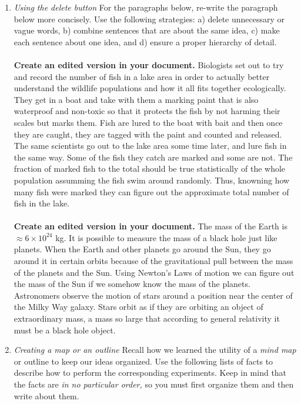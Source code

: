 \documentclass{article}
\begin{document}
\begin{enumerate}
\item \textit{Using the delete button} For the paragraphs below, re-write the paragraph below more concisely.  Use the following strategies: a) delete unnecessary or vague words, b) combine sentences that are about the same idea, c) make each sentence about one idea, and d) ensure a proper hierarchy of detail. \\ \\
\textbf{Create an edited version in your document.}  Biologists set out to try and record the number of fish in a lake area in order to actually better understand the wildlife populations and how it all fits together ecologically.  They get in a boat and take with them a marking paint that is also waterproof and non-toxic so that it protects the fish by not harming their scales but marks them.  Fish are lured to the boat with bait and then once they are caught, they are tagged with the paint and counted and released.  The same scientists go out to the lake area some time later, and lure fish in the same way.  Some of the fish they catch are marked and some are not.  The fraction of marked fish to the total should be true statistically of the whole population assumming the fish swim around randomly.  Thus, knowning how many fish were marked they can figure out the approximate total number of fish in the lake. \\ \\
\textbf{Create an edited version in your document.}  The mass of the Earth is $\approx 6 \times 10^{24}$ kg. It is possible to measure the mass of a black hole just like planets.  When the Earth and other planets go around the Sun, they go around it in certain orbits because of the gravitational pull between the mass of the planets and the Sun.  Using Newton's Laws of motion we can figure out the mass of the Sun if we somehow know the mass of the planets.  Astronomers observe the motion of stars around a position near the center of the Milky Way galaxy.  Stars orbit as if they are orbiting an object of extraordinary mass, a mass so large that according to general relativity it must be a black hole object.
\item \textit{Creating a map or an outline} Recall how we learned the utility of a \textit{mind map} or outline to keep our ideas organized.  Use the following lists of facts to describe how to perform the corresponding experiments.  Keep in mind that the facts are \textit{in no particular order,} so you must first organize them and then write about them. \\ \\

\end{enumerate}
\end{document}

